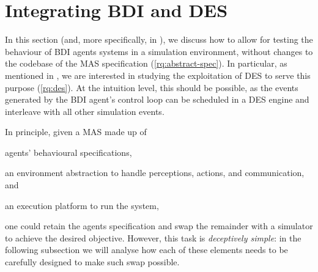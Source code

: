 \section{Integrating \ac{BDI} and \ac{DES}}
\label{sec:simulation:bdi-over-des}


In this section
(and, more specifically, in ),
we discuss how to allow
for testing the behaviour of \ac{BDI} agents systems
in a simulation environment,
without changes to the codebase of the \ac{MAS} specification (\ref{rq:abstract-spec}).
%
In particular,
as mentioned in ,
we are interested in studying the exploitation of \ac{DES} to serve this purpose (\ref{rq:des}).
%
At the intuition level,
this should be possible,
as the events generated by the \ac{BDI} agent's control loop
can be scheduled in a \ac{DES} engine and interleave with all other simulation events.

In principle,
given a \ac{MAS} made up of
\begin{inlinelist}
    \item agents' behavioural specifications,
    \item an environment abstraction to handle perceptions, actions, and communication,
    and
    \item an execution platform to run the system,
\end{inlinelist}
one could retain the agents specification and swap the remainder with a simulator
to achieve the desired objective.
%
However, this task is \emph{deceptively simple}:
in the following subsection we will analyse how each of these elements
needs to be carefully designed to make such swap possible.


